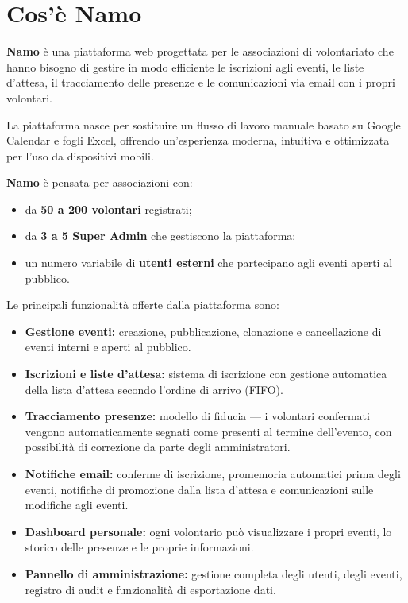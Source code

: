 \documentclass[a4paper,11pt,oneside]{book}
\newcommand{\namo}{\textbf{Namo}}
\begin{document}
\section{Cos'\`e Namo}
\label{sec:cose-namo}

\namo{} \`e una piattaforma web progettata per le associazioni di volontariato che hanno bisogno di gestire in modo efficiente le iscrizioni agli eventi, le liste d'attesa, il tracciamento delle presenze e le comunicazioni via email con i propri volontari.

La piattaforma nasce per sostituire un flusso di lavoro manuale basato su Google Calendar e fogli Excel, offrendo un'esperienza moderna, intuitiva e ottimizzata per l'uso da dispositivi mobili.

\namo{} \`e pensata per associazioni con:
\begin{itemize}[leftmargin=1.5em]
  \item da \textbf{50 a 200 volontari} registrati;
  \item da \textbf{3 a 5 Super Admin} che gestiscono la piattaforma;
  \item un numero variabile di \textbf{utenti esterni} che partecipano agli eventi aperti al pubblico.
\end{itemize}

Le principali funzionalit\`a offerte dalla piattaforma sono:
\begin{itemize}[leftmargin=1.5em]
  \item \textbf{Gestione eventi:} creazione, pubblicazione, clonazione e cancellazione di eventi interni e aperti al pubblico.
  \item \textbf{Iscrizioni e liste d'attesa:} sistema di iscrizione con gestione automatica della lista d'attesa secondo l'ordine di arrivo (FIFO).
  \item \textbf{Tracciamento presenze:} modello di fiducia --- i volontari confermati vengono automaticamente segnati come presenti al termine dell'evento, con possibilit\`a di correzione da parte degli amministratori.
  \item \textbf{Notifiche email:} conferme di iscrizione, promemoria automatici prima degli eventi, notifiche di promozione dalla lista d'attesa e comunicazioni sulle modifiche agli eventi.
  \item \textbf{Dashboard personale:} ogni volontario pu\`o visualizzare i propri eventi, lo storico delle presenze e le proprie informazioni.
  \item \textbf{Pannello di amministrazione:} gestione completa degli utenti, degli eventi, registro di audit e funzionalit\`a di esportazione dati.
\end{itemize}
\end{document}

